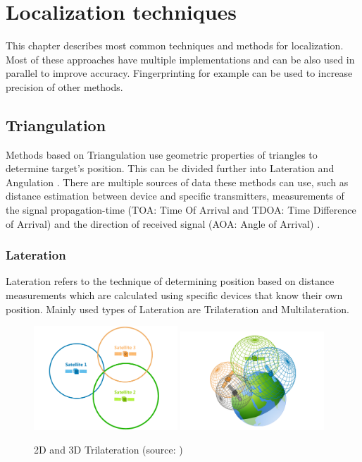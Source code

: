 \chapter{Localization techniques}\label{sec:LocalizationTechniques}
This chapter describes most common techniques and methods for localization. Most of these approaches have multiple implementations and can be also used in parallel to improve accuracy. Fingerprinting for example can be used to increase precision of other methods.

\section{Triangulation}\label{sec:Triangulation}
Methods based on Triangulation use geometric properties of triangles to determine target's position. This can be divided further into Lateration and Angulation \cite{RAinWILTaS}. There are multiple sources of data these methods can use, such as distance estimation between device and specific transmitters, measurements of the signal propagation-time (TOA: Time Of Arrival and TDOA: Time Difference of Arrival\cite{LTinWSN}) and the direction of received
signal (AOA: Angle of Arrival\cite{AoALforWSN}) \cite{IILUBLEB}.

\subsection{Lateration}\label{sec:Lateration}
Lateration refers to the technique of determining position based on distance measurements which are calculated using specific devices that know their own position. Mainly used types of Lateration are Trilateration and Multilateration. 

\begin{figure}[h!]
	\begin{centering}
		\includegraphics[width=0.48\textwidth]{img/trilateration_2d}
		\includegraphics[width=0.48\textwidth]{img/trilateration_3d}
		\par\end{centering}
	\caption{2D and 3D Trilateration (source: \cite{TvTHGPSRW})\label{fig:2d_and_3d_trilateration}}
	\label{fig01c02}
\end{figure}

